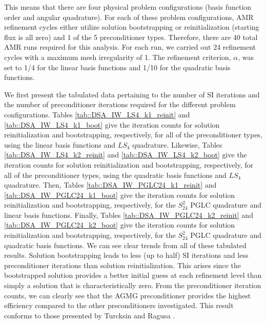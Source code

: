 \noindent This means that there are four physical problem configurations (basis function order and angular quadrature). For each of these problem configurations, AMR refinement cycles either utilize solution bootstrapping or reinitialization (starting flux is all zero) and 1 of the 5 preconditioner types. Therefore, there are 40 total AMR runs required for this analysis. For each run, we carried out 24 refinement cycles with a maximum mesh irregularity of 1. The refinement criterion, $\alpha$, was set to 1/4 for the linear basis functions and 1/10 for the quadratic basis functions.

We first present the tabulated data pertaining to the number of SI iterations and the number of preconditioner iterations required for the different problem configurations. Tables \ref{tab::DSA_IW_LS4_k1_reinit} and \ref{tab::DSA_IW_LS4_k1_boot} give the iteration counts for solution reinitialization and bootstrapping, respectively, for all of the preconditioner types, using the linear basis functions and $LS_4$ quadrature. Likewise, Tables \ref{tab::DSA_IW_LS4_k2_reinit} and \ref{tab::DSA_IW_LS4_k2_boot} give the iteration counts for solution reinitialization and bootstrapping, respectively, for all of the preconditioner types, using the quadratic basis functions and $LS_4$ quadrature. Then, Tables \ref{tab::DSA_IW_PGLC24_k1_reinit} and \ref{tab::DSA_IW_PGLC24_k1_boot} give the iteration counts for solution reinitialization and bootstrapping, respectively, for the $S_{24}^2$ PGLC quadrature and linear basis functions. Finally, Tables \ref{tab::DSA_IW_PGLC24_k2_reinit} and \ref{tab::DSA_IW_PGLC24_k2_boot} give the iteration counts for solution reinitialization and bootstrapping, respectively, for the $S_{24}^2$ PGLC quadrature and quadratic basis functions. We can see clear trends from all of these tabulated results. Solution bootstrapping leads to less (up to half) SI iterations and less preconditioner iterations than solution reinitialization. This arises since the bootstrapped solution provides a better initial guess at each refinement level than simply a solution that is characteristically zero. From the preconditioner iteration counts, we can clearly see that the AGMG preconditioner provides the highest efficiency compared to the other preconditioners investigated. This result conforms to those presented by Turcksin and Ragusa \cite{turcksin2014discontinuous}.

